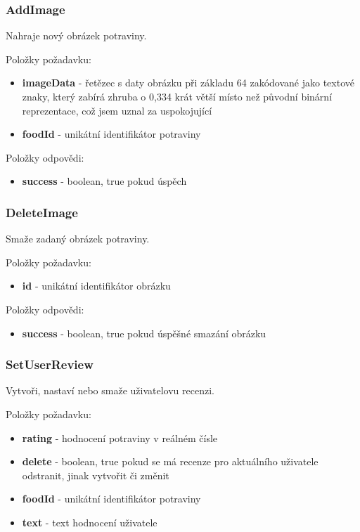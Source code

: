 \documentclass[thesis=B,czech]{FITthesis}[2013/10/20]
\begin{document}
\subsubsection{AddImage}
Nahraje nový obrázek potraviny.

Položky požadavku:
\begin{itemize}
  \item \textbf{imageData} - řetězec s daty obrázku při základu 64 zakódované jako textové znaky, který zabírá zhruba o 0,334 krát větší místo než původní binární reprezentace, což jsem uznal za uspokojující
  \item \textbf{foodId} - unikátní identifikátor potraviny
\end{itemize}

Položky odpovědi:
\begin{itemize}
  \item \textbf{success} - boolean, true pokud úspěch
\end{itemize}

\subsubsection{DeleteImage}
Smaže zadaný obrázek potraviny.

Položky požadavku:
\begin{itemize}
  \item \textbf{id} - unikátní identifikátor obrázku
\end{itemize}

Položky odpovědi:
\begin{itemize}
  \item \textbf{success} - boolean, true pokud úspěšné smazání obrázku
\end{itemize}

\subsubsection{SetUserReview}
Vytvoři, nastaví nebo smaže uživatelovu recenzi.

Položky požadavku:
\begin{itemize}
  \item \textbf{rating} - hodnocení potraviny v reálném čísle
  \item \textbf{delete} - boolean, true pokud se má recenze pro aktuálního uživatele odstranit, jinak vytvořit či změnit
  \item \textbf{foodId} - unikátní identifikátor potraviny
  \item \textbf{text} - text hodnocení uživatele
\end{itemize}
\end{document}
